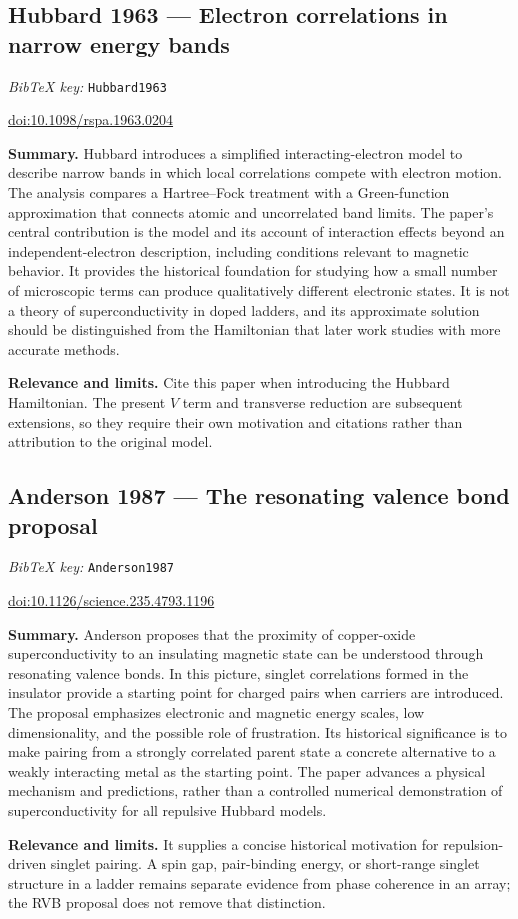 \documentclass[11pt]{article}
\newcommand{\paper}[2]{\Needspace{8\baselineskip}\subsection{#2}\label{paper:#1}\textit{BibTeX key:} \texttt{#1}\quad\citep{#1}\par}
\newcommand{\doi}[1]{\href{https://doi.org/#1}{doi:#1}}
\newcommand{\summary}{\par\textbf{Summary.} }
\newcommand{\relevance}{\par\textbf{Relevance and limits.} }
\begin{document}
\paper{Hubbard1963}{Hubbard 1963 --- Electron correlations in narrow energy bands}
\doi{10.1098/rspa.1963.0204}
\summary Hubbard introduces a simplified interacting-electron model to describe narrow bands in which local correlations compete with electron motion. The analysis compares a Hartree--Fock treatment with a Green-function approximation that connects atomic and uncorrelated band limits. The paper's central contribution is the model and its account of interaction effects beyond an independent-electron description, including conditions relevant to magnetic behavior. It provides the historical foundation for studying how a small number of microscopic terms can produce qualitatively different electronic states. It is not a theory of superconductivity in doped ladders, and its approximate solution should be distinguished from the Hamiltonian that later work studies with more accurate methods.
\relevance Cite this paper when introducing the Hubbard Hamiltonian. The present $V$ term and transverse reduction are subsequent extensions, so they require their own motivation and citations rather than attribution to the original model.

\paper{Anderson1987}{Anderson 1987 --- The resonating valence bond proposal}
\doi{10.1126/science.235.4793.1196}
\summary Anderson proposes that the proximity of copper-oxide superconductivity to an insulating magnetic state can be understood through resonating valence bonds. In this picture, singlet correlations formed in the insulator provide a starting point for charged pairs when carriers are introduced. The proposal emphasizes electronic and magnetic energy scales, low dimensionality, and the possible role of frustration. Its historical significance is to make pairing from a strongly correlated parent state a concrete alternative to a weakly interacting metal as the starting point. The paper advances a physical mechanism and predictions, rather than a controlled numerical demonstration of superconductivity for all repulsive Hubbard models.
\relevance It supplies a concise historical motivation for repulsion-driven singlet pairing. A spin gap, pair-binding energy, or short-range singlet structure in a ladder remains separate evidence from phase coherence in an array; the RVB proposal does not remove that distinction.
\end{document}
